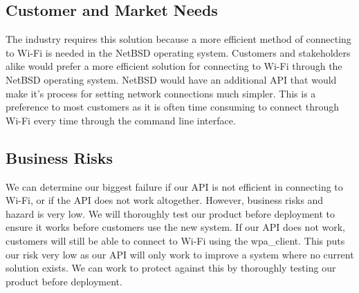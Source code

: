 \subsection{Customer and Market Needs}

The industry requires this solution because a more efficient method of connecting to Wi-Fi is needed in the NetBSD operating system. Customers and stakeholders alike would prefer a more efficient solution for connecting to Wi-Fi through the NetBSD operating system. NetBSD would have an additional API that would make it’s process for setting network connections much simpler. This is a preference to most customers as it is often time consuming to connect through Wi-Fi every time through the command line interface. 

\subsection{Business Risks}

We can determine our biggest failure if our API is not efficient in connecting to Wi-Fi, or if the API does not work altogether. However, business risks and hazard is very low. We will thoroughly test our product before deployment to ensure it works before customers use the new system. If our API does not work, customers will still be able to connect to Wi-Fi using the wpa_client. This puts our risk very low as our API will only work to improve a system where no current solution exists. We can work to protect against this by thoroughly testing our product before deployment. 

